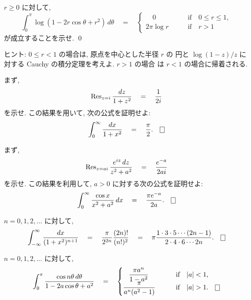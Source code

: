 \documentclass[12pt,twoside]{jarticle}
\begin{document}
\begin{question}
  $r \ge 0$ に対して,
  \[
    \int_0^\pi \log(1 - 2r\cos\theta + r^2)\,d\theta
    \quad = \quad
    \begin{cases}
      \quad 0    \qquad & \text{if}\quad 0 \le r \le 1, \\
      2\pi\log r \qquad & \text{if}\quad r > 1
    \end{cases}
  \]
  が成立することを示せ. \qed
\end{question}

\noindent ヒント: $0 \le r < 1$ の場合は, 原点を中心とした半径 $r$ の
円と $\log(1 - z)/z$ に対する Cauchy の積分定理を考えよ. $r>1$ の場合
は $r<1$ の場合に帰着される.

\begin{question}
  まず,
  \[
    \mathop{\mathrm{Res}}\nolimits_{z=i}\frac{dz}{1+z^2} 
    \quad = \quad
    \frac{1}{2i}
  \]
  を示せ. この結果を用いて, 次の公式を証明せよ:
  \[
    \int_0^\infty \frac{dx}{1+x^2} 
    \quad = \quad
    \frac{\pi}{2}.
    \qed
  \]
\end{question}

\begin{question}
  まず, 
  \[
    \mathop{\mathrm{Res}}\nolimits_{z=ai}\frac{e^{iz}\,dz}{z^2 + a^2} 
    \quad = \quad
    \frac{e^{-a}}{2ai}
  \]
  を示せ. この結果を利用して, $a > 0$ に対する次の公式を証明せよ:
  \[
    \int_0^\infty \frac{\cos x}{x^2 + a^2}\,dx
    \quad = \quad
    \frac{\pi e^{-a}}{2a}.
  \qed
  \]
\end{question}

\begin{question}
  $n = 0,1,2,\dots$ に対して,
  \[
    \int_{-\infty}^\infty \frac{dx}{(1+x^2)^{n+1}}
    \quad = \quad
    \frac{\pi}{2^{2n}}\frac{(2n)!}{(n!)^2}
    \quad = \quad
    \pi \frac{1 \cdot 3 \cdot 5 \cdots (2n - 1)}
             {2 \cdot 4 \cdot 6 \cdots 2n}.
    \qed
  \]
\end{question}

\begin{question}
  $n=0,1,2,\dots$ に対して,
  \[
    \int_0^\pi \frac{\cos n\theta\,d\theta}
                    {1 - 2a \cos\theta + a^2}
    \quad = \quad
    \begin{cases}
      \displaystyle \;\;\;
      \frac{\pi a^n}{1 - a^2}  \qquad & \text{if}\quad |a|<1,\\
      \displaystyle
      \frac{\pi}{a^n(a^2 - 1)} \qquad & \text{if}\quad |a|>1. \qed
    \end{cases}
  \]
\end{question}
\end{document}
